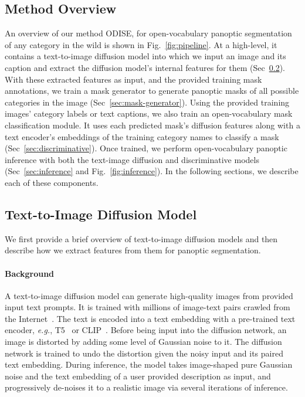 \documentclass[10pt,twocolumn,letterpaper]{article}
\newcommand{\ourmethod}{ODISE}
\begin{document}
\subsection{Method Overview}
\vspace{-0.25em}
An overview of our method \ourmethod{}, for open-vocabulary panoptic segmentation of any category in the wild is shown in Fig.~\ref{fig:pipeline}. At a high-level, it contains a text-to-image diffusion model into which we input an image and its caption and extract the diffusion model's internal features for them (Sec~\ref{sec:diffusion}).
With these extracted features as input, and the provided training mask annotations, we train a mask generator to generate panoptic masks of all possible categories in the image (Sec~\ref{sec:mask-generator}). Using the provided training images' category labels or text captions, we also train an open-vocabulary mask classification module. It uses each predicted mask's diffusion features along with a text encoder's embeddings of the training category names to classify a mask (Sec~\ref{sec:discriminative}). 
Once trained, we perform open-vocabulary panoptic inference with both the text-image diffusion and discriminative models (Sec~\ref{sec:inference} and Fig.~\ref{fig:inference}). In the following sections, we describe each of these components.

\subsection{Text-to-Image Diffusion Model}
\label{sec:diffusion}
\vspace{-0.25em}
We first provide a brief overview of text-to-image diffusion models and then describe how we extract features from them for panoptic segmentation. 

\paragraph{Background}

A text-to-image diffusion model can generate high-quality images from provided input text prompts. 
It is trained with millions of image-text pairs crawled from the Internet~\cite{nichol2021glide, ramesh2022dalle2, saharia2022imagen}. 
The text is encoded into a text embedding with a pre-trained text encoder, \textit{e.g.}, T5~\cite{raffel2020t5} or CLIP~\cite{radford2021clip}.
Before being input into the diffusion network, an image is distorted by adding some level of Gaussian noise to it. 
The diffusion network is trained to undo the distortion given the noisy input and its paired text embedding.
During inference, the model takes image-shaped pure Gaussian noise and the text embedding of a user provided description as input, and progressively de-noises it to a realistic image via several iterations of inference. 
\end{document}
